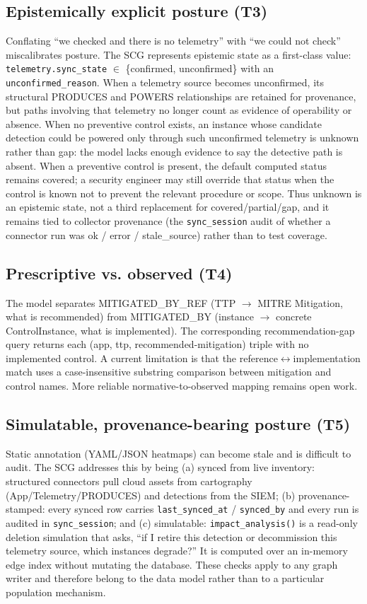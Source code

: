 \documentclass[10pt]{article}
\newcommand{\code}[1]{\texttt{#1}}
\begin{document}
\subsection{Epistemically explicit posture (T3)}
Conflating ``we checked and there is no telemetry'' with ``we could not check'' miscalibrates posture. The SCG represents epistemic state as a first-class value: \code{telemetry.sync\_state} $\in$ \{confirmed, unconfirmed\} with an \code{unconfirmed\_reason}. When a telemetry source becomes unconfirmed, its structural PRODUCES and POWERS relationships are retained for provenance, but paths involving that telemetry no longer count as evidence of operability or absence. When no preventive control exists, an instance whose candidate detection could be powered only through such unconfirmed telemetry is unknown rather than gap: the model lacks enough evidence to say the detective path is absent. When a preventive control is present, the default computed status remains covered; a security engineer may still override that status when the control is known not to prevent the relevant procedure or scope. Thus unknown is an epistemic state, not a third replacement for covered/partial/gap, and it remains tied to collector provenance (the \code{sync\_session} audit of whether a connector run was ok / error / stale\_source) rather than to test coverage.

\subsection{Prescriptive vs. observed (T4)}
The model separates MITIGATED\_BY\_REF (TTP $\rightarrow$ MITRE Mitigation, what is recommended) from MITIGATED\_BY (instance $\rightarrow$ concrete ControlInstance, what is implemented). The corresponding recommendation-gap query returns each (app, ttp, recommended-mitigation) triple with no implemented control. A current limitation is that the reference$\leftrightarrow$implementation match uses a case-insensitive substring comparison between mitigation and control names. More reliable normative-to-observed mapping remains open work.

\subsection{Simulatable, provenance-bearing posture (T5)}
Static annotation (YAML/JSON heatmaps) can become stale and is difficult to audit. The SCG addresses this by being (a) synced from live inventory: structured connectors pull cloud assets from cartography (App/Telemetry/PRODUCES) and detections from the SIEM; (b) provenance-stamped: every synced row carries \code{last\_synced\_at} / \code{synced\_by} and every run is audited in \code{sync\_session}; and (c) simulatable: \code{impact\_analysis()} is a read-only deletion simulation that asks, ``if I retire this detection or decommission this telemetry source, which instances degrade?'' It is computed over an in-memory edge index without mutating the database. These checks apply to any graph writer and therefore belong to the data model rather than to a particular population mechanism.
\end{document}
